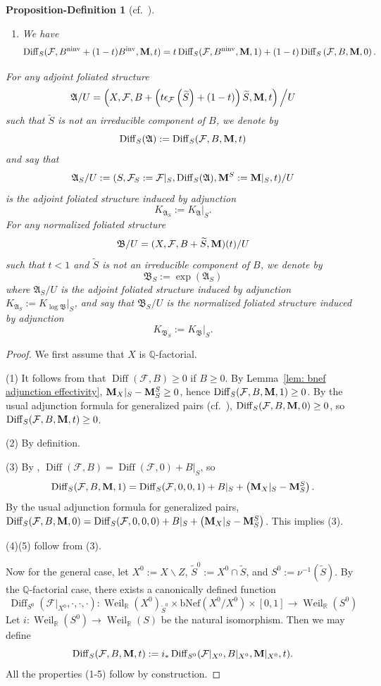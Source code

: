 \documentclass[11pt,reqno]{amsart}
\numberwithin{equation}{section}
\newcommand{\Mm}{{\bf{M}}}
\newcommand{\ninv}{\operatorname{ninv}}
\newcommand{\inv}{\operatorname{inv}}
\newcommand{\Weil}{\operatorname{Weil}}
\newcommand{\Diff}{\operatorname{Diff}}
\newcommand{\Aa}{{\mathfrak{A}}}
\newcommand{\Bb}{{\mathfrak{B}}}
\newcommand{\Ff}{\mathcal{F}}
\newcommand{\bNef}{\mathrm{bNef}}
\newtheorem{prodef}[thm]{Proposition-Definition}
\theoremstyle{definition}
\begin{document}
\begin{prodef}[{cf.~\cite[Proposition-Definition~3.7]{CS25a}}]
\begin{enumerate}
    \item We have
    $$\Diff_S(\Ff,B^{\ninv}+(1-t)B^{\inv},\Mm,t)=t\Diff_S(\Ff,B^{\ninv},\Mm,1)+(1-t)\Diff_S\left(\Ff,B,\Mm,0\right).$$
\end{enumerate}
For any adjoint foliated structure
$$\Aa/U=\left(X,\Ff,B+\left(t\epsilon_{\Ff}\left(\widetilde{S}\right)+(1-t)\right)\widetilde{S},\Mm,t\right)\Big/U$$
such that $\widetilde{S}$ is not an irreducible component of $B$, we denote by 
$$\Diff_S(\Aa):=\Diff_S(\Ff,B,\Mm,t)$$
and say that
$$\Aa_S/U:=(S,\Ff_S:=\Ff|_S,\Diff_S(\Aa),\Mm^S:=\Mm|_S,t)/U$$
is the adjoint foliated structure induced by adjunction
$$K_{\Aa_S}:=K_{\Aa}|_S.$$
For any normalized foliated structure
$$\Bb/U=(X,\Ff,B+\widetilde{S},\Mm)(t)/U$$
such that $t<1$ and $\widetilde{S}$ is not an irreducible component of $B$, we denote by
$$\Bb_S:=\exp(\Aa_S)$$
where $\Aa_S/U$ is the adjoint foliated structure induced by adjunction $K_{\Aa_S}:=K_{\log\Bb}|_S$, and say that $\Bb_S/U$ is the normalized 
foliated structure induced by adjunction
$$K_{\Bb_S}:=K_{\Bb}|_S.$$
\end{prodef}
\begin{proof}
We first assume that $X$ is $\mathbb Q$-factorial.

(1) 
It follows from \cite[Proposition-Definition~3.7]{CS25a} that $\Diff(\Ff,B)\geq 0$ if $B\geq 0$. By Lemma~\ref{lem: bnef adjunction effectivity}, $\Mm_X|_S-\Mm^S_S\geq 0$, hence $\Diff_S(\Ff,B,\Mm,1)\geq 0$. By the usual adjunction formula for generalized pairs (cf.~\cite[Definition~4.7]{BZ16}), $\Diff_S(\Ff,B,\Mm,0)\geq 0$, so $\Diff_S(\Ff,B,\Mm,t)\geq 0$.

(2) By definition.

(3) By \cite[Proposition-Definition~3.7]{CS25a}, $\Diff(\Ff,B)=\Diff(\Ff,0)+B|_S$, so $$\Diff_S(\Ff,B,\Mm,1)=\Diff_S(\Ff,0,0,1)+B|_S+\left(\Mm_X|_S-\Mm^S_S\right).$$ By the usual adjunction formula for generalized pairs, $\Diff_S(\Ff,B,\Mm,0)=\Diff_S(\Ff,0,0,0)+B|_S+\left(\Mm_X|_S-\Mm^S_S\right)$. This implies (3).

(4)(5) follow from (3).

Now for the general case, let $X^0:=X\backslash Z$, $\widetilde S^0:=X^0\cap\widetilde{S}$, and $S^0:=\nu^{-1}(\widetilde{S})$. By the $\mathbb Q$-factorial case, there exists a canonically defined function
$$\Diff_{S^0}(\Ff|_{X^0},\cdot,\cdot,\cdot):\Weil_{\mathbb R}(X^0)_{\widetilde{S}^0}\times\bNef(X^0/X^0)\times [0,1]\rightarrow\Weil_{\mathbb R}(S^0)$$
Let $i: \Weil_{\mathbb R}(S^0)\rightarrow \Weil_{\mathbb R}(S)$ be the natural isomorphism. Then we may define
$$\Diff_{S}(\Ff,B,\Mm,t):=i_*\Diff_{S^0}(\Ff|_{X^0},B|_{X^0},\Mm|_{X^0},t).$$
All the properties (1-5) follow by construction.
\end{proof}
\end{document}
